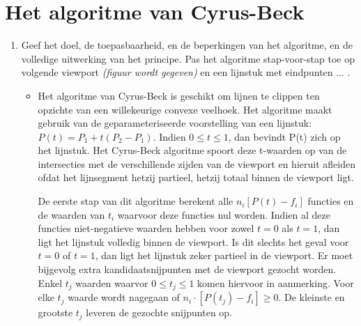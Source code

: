 \documentclass{report}
\newcommand{\vraag}[2]{
	\item #1
	
	#2
}
\begin{document}
	\section{Het algoritme van Cyrus-Beck}
	\begin{enumerate}
		\vraag{Geef het doel, de toepasbaarheid, en de beperkingen van het algoritme, en de volledige uitwerking van het principe. Pas het algoritme stap-voor-stap toe op volgende viewport \textit{(figuur wordt gegeven)} en een lijnstuk met eindpunten ... .  \accentuate{(§2.3.2)}}{
			\begin{itemize} 
				\item Het algoritme van Cyrus-Beck is geschikt om lijnen te clippen ten opzichte van een willekeurige convexe veelhoek. Het algoritme maakt gebruik van de geparameteriseerde voorstelling van een lijnstuk: $P(t) = P_1 + t(P_2 - P_1)$. Indien $0 \leq t \leq 1$, dan bevindt P(t) zich op het lijnstuk. Het Cyrus-Beck algoritme spoort deze t-waarden op van de intersecties met de verschillende zijden van de viewport en hieruit afleiden ofdat het lijnsegment hetzij partieel, hetzij totaal binnen de viewport ligt.
				
				De eerste stap van dit algoritme berekent alle $n_i[P(t) - f_i]$ functies en de waarden van $t_i$ waarvoor deze functies nul worden. Indien al deze functies niet-negatieve waarden hebben voor zowel $t = 0$ als $t = 1$, dan ligt het lijnstuk volledig binnen de viewport. Is dit slechts het geval voor $t = 0$ of $t = 1$, dan ligt het lijnstuk zeker partieel in de viewport. Er moet bijgevolg extra kandidaatsnijpunten met de viewport gezocht worden. Enkel $t_j$ waarden waarvor $0 \leq t_j \leq 1$ komen hiervoor in aanmerking. Voor elke $t_j$ waarde wordt nagegaan of $n_i \cdot [P(t_j) - f_i] \geq 0$. De kleinste en grootste $t_j$ leveren de gezochte snijpunten op.
				

\end{itemize}}
\end{enumerate}
\end{document}
